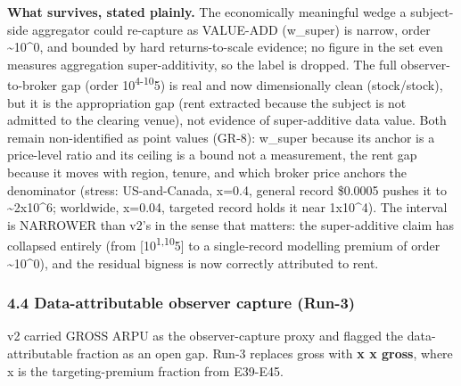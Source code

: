 \documentclass[
  11pt,
]{article}
\begin{document}
\textbf{What survives, stated plainly.} The economically meaningful
wedge a subject-side aggregator could re-capture as VALUE-ADD (w\_super)
is narrow, order \textasciitilde10\^{}0, and bounded by hard
returns-to-scale evidence; no figure in the set even measures
aggregation super-additivity, so the label is dropped. The full
observer-to-broker gap (order 10\textsuperscript{4-10}5) is real and now
dimensionally clean (stock/stock), but it is the appropriation gap (rent
extracted because the subject is not admitted to the clearing venue),
not evidence of super-additive data value. Both remain non-identified as
point values (GR-8): w\_super because its anchor is a price-level ratio
and its ceiling is a bound not a measurement, the rent gap because it
moves with region, tenure, and which broker price anchors the
denominator (stress: US-and-Canada, x=0.4, general record \$0.0005
pushes it to \textasciitilde2x10\^{}6; worldwide, x=0.04, targeted
record holds it near 1x10\^{}4). The interval is NARROWER than v2's in
the sense that matters: the super-additive claim has collapsed entirely
(from {[}10\textsuperscript{1,10}5{]} to a single-record modelling
premium of order \textasciitilde10\^{}0), and the residual bigness is
now correctly attributed to rent.

\subsubsection{4.4 Data-attributable observer capture
(Run-3)}\label{data-attributable-observer-capture-run-3}

v2 carried GROSS ARPU as the observer-capture proxy and flagged the
data-attributable fraction as an open gap. Run-3 replaces gross with
\textbf{x x gross}, where x is the targeting-premium fraction from
E39-E45.
\end{document}
